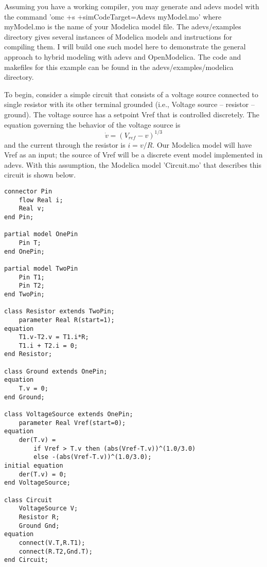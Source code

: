 Assuming you have a working compiler, you may generate and adevs model with the command 'omc +s +simCodeTarget=Adevs myModel.mo' where myModel.mo is the name of your Modelica model file. The adevs/examples directory gives several instances of Modelica models and instructions for compiling them. I will build one such model here to demonstrate the general approach to hybrid modeling with adevs and OpenModelica. The code and makefiles for this example can be found in the adevs/examples/modelica directory.

To begin, consider a simple circuit that consists of a voltage source connected to single resistor with its other terminal grounded (i.e., Voltage source -- resistor -- ground). The voltage source has a setpoint Vref that is controlled discretely. The equation governing the behavior of the voltage source is
\begin{equation*}
\dot{v} = (V_{ref} - v)^{1/3}
\end{equation*}
and the current through the resistor is $i = v/R$. Our Modelica model will have Vref as an input; the source of Vref will be a discrete event model implemented in adevs. With this assumption, the Modelica model 'Circuit.mo' that describes this circuit is shown below.
\begin{verbatim}
connector Pin
    flow Real i;
    Real v;
end Pin;

partial model OnePin
    Pin T;
end OnePin;

partial model TwoPin
    Pin T1;
    Pin T2;
end TwoPin;

class Resistor extends TwoPin;
    parameter Real R(start=1);
equation
    T1.v-T2.v = T1.i*R;
    T1.i + T2.i = 0;
end Resistor;

class Ground extends OnePin;
equation
    T.v = 0;
end Ground;

class VoltageSource extends OnePin;
    parameter Real Vref(start=0);
equation
    der(T.v) = 
        if Vref > T.v then (abs(Vref-T.v))^(1.0/3.0)
        else -(abs(Vref-T.v))^(1.0/3.0);
initial equation
    der(T.v) = 0;
end VoltageSource;

class Circuit
    VoltageSource V;
    Resistor R;
    Ground Gnd;
equation
    connect(V.T,R.T1);
    connect(R.T2,Gnd.T);
end Circuit;
\end{verbatim}

